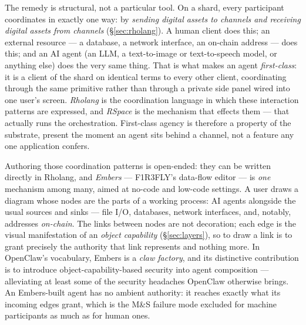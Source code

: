 \documentclass[11pt]{article}
\begin{document}
The remedy is structural, not a particular tool. On a shard, every participant coordinates in exactly one way: by \emph{sending digital assets to channels and receiving digital assets from channels} (\S\ref{sec:rholang}). A human client does this; an external resource --- a database, a network interface, an on-chain address --- does this; and an AI agent (an LLM, a text-to-image or text-to-speech model, or anything else) does the very same thing. That is what makes an agent \emph{first-class}: it is a client of the shard on identical terms to every other client, coordinating through the same primitive rather than through a private side panel wired into one user's screen. \emph{Rholang} is the coordination language in which these interaction patterns are expressed, and \emph{RSpace} is the mechanism that effects them --- that actually runs the orchestration. First-class agency is therefore a property of the substrate, present the moment an agent sits behind a channel, not a feature any one application confers.

Authoring those coordination patterns is open-ended: they can be written directly in Rholang, and \emph{Embers} --- F1R3FLY's data-flow editor --- is \emph{one} mechanism among many, aimed at no-code and low-code settings. A user draws a diagram whose nodes are the parts of a working process: AI agents alongside the usual sources and sinks --- file I/O, databases, network interfaces, and, notably, addresses \emph{on-chain}. The links between nodes are not decoration; each edge is the visual manifestation of an \emph{object capability} (\S\ref{sec:layers}), so to draw a link is to grant precisely the authority that link represents and nothing more. In OpenClaw's vocabulary, Embers is a \emph{claw factory}, and its distinctive contribution is to introduce object-capability-based security into agent composition --- alleviating at least some of the security headaches OpenClaw otherwise brings. An Embers-built agent has no ambient authority: it reaches exactly what its incoming edges grant, which is the M\&S failure mode excluded for machine participants as much as for human ones.
\end{document}
